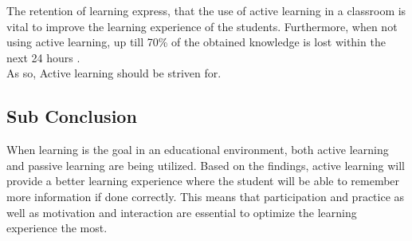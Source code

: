The retention of learning express, that the use of active learning in a classroom is vital to improve the learning experience of the students. Furthermore, when not using active learning, up till 70\% of the obtained knowledge is lost within the next 24 hours \cite{learning}.\\
As so, Active learning should be striven for.  
\\
\subsection*{Sub Conclusion}
When learning is the goal in an educational environment, both active learning and passive learning are being utilized. Based on the findings, active learning will provide a better learning experience where the student will be able to remember more information if done correctly. This means that participation and practice as well as motivation and interaction are essential to optimize the learning experience the most.\\

